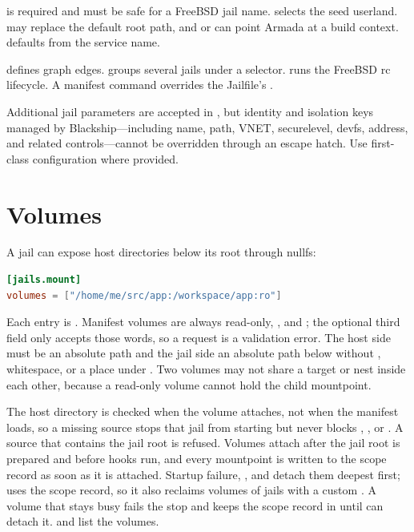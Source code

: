  is required and must be safe for a FreeBSD jail name.
 selects the seed userland.  may replace the
default root path, and  or  can point Armada at
a build context.  defaults from the service name.

 defines graph edges.  groups several jails
under a selector.  runs the FreeBSD rc lifecycle. A
manifest  command overrides the Jailfile's .

Additional jail parameters are accepted in , but identity and
isolation keys managed by Blackship---including name, path, VNET, securelevel,
devfs, address, and related  controls---cannot be overridden
through an escape hatch. Use first-class configuration where provided.

\section{Volumes}

A jail can expose host directories below its root through nullfs:

\begin{lstlisting}[language=TOML]
[jails.mount]
volumes = ["/home/me/src/app:/workspace/app:ro"]
\end{lstlisting}

Each entry is . Manifest volumes are always read-only,
, and ; the optional third field only accepts
those words, so a  request is a validation error. The host side
must be an absolute path and the jail side an absolute path below \file{/}
without , whitespace, or a place under . Two volumes may
not share a target or nest inside each other, because a read-only volume
cannot hold the child mountpoint.

The host directory is checked when the volume attaches, not when the manifest
loads, so a missing source stops that jail from starting but never blocks
, , or . A source that contains the jail
root is refused. Volumes attach after the jail root is prepared and before
 hooks run, and every mountpoint is written to the scope
record as soon as it is attached. Startup failure, , and
 detach them deepest first;  uses the scope record, so
it also reclaims volumes of jails with a custom . A volume that
stays busy fails the stop and keeps the scope record in  until
 can detach it.  and 
list the volumes.

